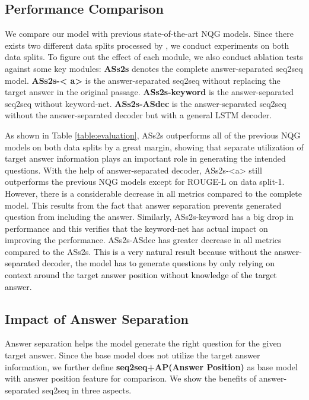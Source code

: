 \documentclass[letterpaper]{article} %
\newcommand{\hh}[1]{\textcolor{black}{#1}}
\begin{document}
\subsection{Performance Comparison}
We compare our model with previous state-of-the-art NQG models. Since there exists two different data splits processed by \cite{du2017learning,zhou2017neural}, we conduct experiments on both data splits. To figure out the effect of each module, we also conduct ablation tests against some key modules: \textbf{ASs2s} denotes the complete answer-separated seq2seq model. \textbf{ASs2s-\textless{} a\textgreater{}} is the answer-separated seq2seq without replacing the target answer in the original passage. \textbf{ASs2s-keyword} is the answer-separated seq2seq without keyword-net. \textbf{ASs2s-ASdec} is the answer-separated seq2seq without the answer-separated decoder but with a general LSTM decoder.

As shown in Table \ref{table:evaluation}, ASs2s outperforms all of the previous NQG models on both data splits by a great margin, showing that separate utilization of target answer information plays an important role in generating the intended questions. With the help of answer-separated decoder, ASs2s-\textless a\textgreater{} still outperforms the previous NQG models except for ROUGE-L on data split-1. However, there is a considerable decrease in all metrics compared to the complete model. This results from the fact that answer separation prevents generated question from including the answer. Similarly, ASs2s-keyword has a big drop in performance and this verifies that the keyword-net has actual impact on improving the performance. ASs2s-ASdec has greater decrease in all metrics compared to the ASs2s. \hh{This is a very natural result because without the answer-separated decoder, the model has to generate questions by only relying on context around the target answer position without knowledge of the target answer.}


\subsection{Impact of Answer Separation}
Answer separation helps the model generate  the right question for the given target answer. Since the base model does not utilize the target answer information, we further define \textbf{seq2seq+AP(Answer Position)} as base model with answer position feature \cite{zhou2017neural} for comparison. We show the benefits of answer-separated seq2seq in three aspects.
\end{document}
